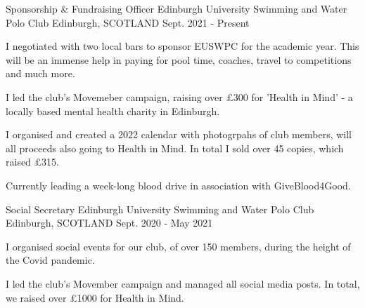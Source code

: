 

\begin{cventries}
  \cventry
    {Sponsorship \& Fundraising Officer} %
    {Edinburgh University Swimming and Water Polo Club} %
    {Edinburgh, SCOTLAND} %
    {Sept. 2021 - Present} %
    {
      \begin{cvitems} %
        \item I negotiated with two local bars to sponsor EUSWPC for the academic year. This will be an immense help in paying for pool time, coaches, travel to competitions and much more.
        \item I led the club's Movemeber campaign, raising over £300 for 'Health in Mind' - a locally based mental health charity in Edinburgh.
        \item I organised and created a 2022 calendar with photogrpahs of club members, will all proceeds also going to Health in Mind. In total I sold over 45 copies, which raised £315.
        \item Currently leading a week-long blood drive in association with GiveBlood4Good.
      \end{cvitems}
    }
    \vspace{.08cm}
    
  \cventry
    {Social Secretary} %
    {Edinburgh University Swimming and Water Polo Club} %
    {Edinburgh, SCOTLAND} %
    {Sept. 2020 - May 2021} %
    {
      \begin{cvitems} %
        \item I organised social events for our club, of over 150 members, during the height of the Covid pandemic.
        \item I led the club's Movember campaign and managed all social media posts. In total, we raised over £1000 for Health in Mind.
      \end{cvitems}
    }
    \vspace{.08cm}
    

\end{cventries}
